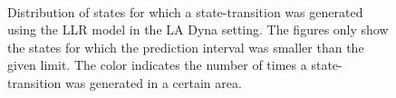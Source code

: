 \begin{figure}[htbp]
	\centering
	\\
	\caption[Inverted pendulum: Distribution of model-generated experience using \acs{LA Dyna}]{Distribution of states for which a state-transition was generated using the \ac{LLR} model in the \ac{LA Dyna} setting. The figures only show the states for which the prediction interval was smaller than the given limit. The color indicates the number of times a state-transition was generated in a certain area.}
	\label{fig:PS-LA_hLLR}
\end{figure}


